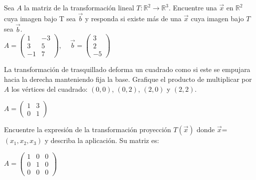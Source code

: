 \bigskip

\begin{exercise}
\item

Sea $A$ la matriz de la transformación lineal $T:\mathbb{R}^2 \rightarrow \mathbb{R}^3$. Encuentre una $\vec{x}$ en $\mathbb{R}^2$ cuya imagen bajo T sea $\vec{b}$ y responda si existe más de una $\vec{x}$ cuya imagen bajo $T$ sea $\vec{b}$.\\

$A=\left(\begin{array}{ccc}1& -3 \\3 & 5\\-1&7
\end{array}
\right)$,   $\quad  \vec{b}=\left(\begin{array}{c}3\\2\\-5
\end{array}
 \right)$\\
\end{exercise}

\begin{exercise}
\item

La transformación de trasquillado deforma un cuadrado como si este se empujara hacia la derecha manteniendo fija la base. Grafique el producto de multiplicar por $A$ los vértices del cuadrado: $(0,0)$, $(0,2)$, $(2,0)$ y $(2,2)$.

\bigskip

 $A=\left(\begin{array}{cc}1& 3 \\0 & 1
\end{array}
\right)$\\
\end{exercise}

\begin{exercise}
\item
Encuentre la expresión de la transformación proyección $T(\vec{x})$ donde $\vec{x}$=$(x_1,x_2,x_3)$ y 
describa la aplicación. Su matriz es:


\bigskip

 $A=\left(\begin{array}{ccc}1& 0&0 \\0 & 1&0\\0&0&0
\end{array}
\right)$
\end{exercise} 

